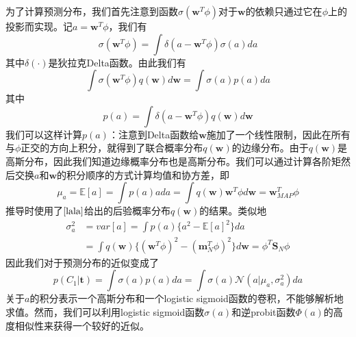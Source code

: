 为了计算预测分布，我们首先注意到函数$\sigma(\boldsymbol{w}^T\phi)$对于$\boldsymbol{w}$的依赖只通过它在$\phi$上的投影而实现。记$a=\boldsymbol{w}^T\phi$，我们有
\begin{equation}
	\sigma(\boldsymbol{w}^T\phi)=\int \delta(a-\boldsymbol{w}^T\phi)\sigma(a)da
\end{equation}
其中$\delta(\cdot)$是狄拉克Delta函数。由此我们有
\begin{equation}
	\int \sigma(\boldsymbol{w}^T\phi)q(\boldsymbol{w})d\boldsymbol{w}=\int \sigma(a)p(a)da
\end{equation}
其中 
\begin{equation}
	p(a)=\int \delta(a-\boldsymbol{w}^T\phi)q(\boldsymbol{w})d\boldsymbol{w}
\end{equation}
我们可以这样计算$p(a)$：注意到Delta函数给$\boldsymbol{w}$施加了一个线性限制，因此在所有与$\phi$正交的方向上积分，就得到了联合概率分布$q(\boldsymbol{w})$的边缘分布。由于$q(\boldsymbol{w})$是高斯分布，因此我们知道边缘概率分布也是高斯分布。我们可以通过计算各阶矩然后交换$a$和$\boldsymbol{w}$的积分顺序的方式计算均值和协方差，即
\begin{equation}
	\mu_a=\mathbb{E}[a]=\int p(a)ada=\int q(\boldsymbol{w})\boldsymbol{w}^T\phi d\boldsymbol{w}=\boldsymbol{w}^T_{MAP}\phi
\end{equation}
推导时使用了$\ref{lala}$给出的后验概率分布$q(\boldsymbol{w})$的结果。类似地
\begin{equation}
\begin{aligned}
	\sigma_a^2&=var[a]=\int p(a)\{a^2-\mathbb{E}[a]^2 \}da\\
	&=\int q(\boldsymbol{w})\{(\boldsymbol{w}^T\phi)^2-(\boldsymbol{m}_N^T\phi)^2\}d\boldsymbol{w}=\phi^T\boldsymbol{S}_N\phi
\end{aligned}
\end{equation}
因此我们对于预测分布的近似变成了
\begin{equation}
	p(C_1|\boldsymbol{t})=\int \sigma(a)p(a)da=\int \sigma(a)\mathcal{N}(a|\mu_a,\sigma_a^2)da
\end{equation}
关于$a$的积分表示一个高斯分布和一个logistic sigmoid函数的卷积，不能够解析地求值。然而，我们可以利用logistic sigmoid函数$\sigma(a)$和逆probit函数$\Phi(a)$的高度相似性来获得一个较好的近似。